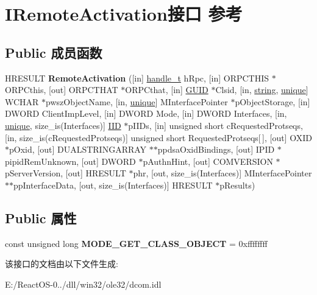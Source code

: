 \hypertarget{interface_i_remote_activation}{}\section{I\+Remote\+Activation接口 参考}
\label{interface_i_remote_activation}
\subsection*{Public 成员函数}
\begin{DoxyCompactItemize}
\item 
\mbox{\label{interface_i_remote_activation_afade8fcb021a199fd4f352177f6fe1b7}} 
H\+R\+E\+S\+U\+LT {\bfseries Remote\+Activation} (\mbox{[}in\mbox{]} \hyperlink{interfacevoid}{handle\+\_\+t} h\+Rpc, \mbox{[}in\mbox{]} O\+R\+P\+C\+T\+H\+IS $\ast$O\+R\+P\+Cthis, \mbox{[}out\mbox{]} O\+R\+P\+C\+T\+H\+AT $\ast$O\+R\+P\+Cthat, \mbox{[}in\mbox{]} \hyperlink{interface_g_u_i_d}{G\+U\+ID} $\ast$Clsid, \mbox{[}in, \hyperlink{structstring}{string}, \hyperlink{interfaceunique}{unique}\mbox{]} W\+C\+H\+AR $\ast$pwsz\+Object\+Name, \mbox{[}in, \hyperlink{interfaceunique}{unique}\mbox{]} M\+Interface\+Pointer $\ast$p\+Object\+Storage, \mbox{[}in\mbox{]} D\+W\+O\+RD Client\+Imp\+Level, \mbox{[}in\mbox{]} D\+W\+O\+RD Mode, \mbox{[}in\mbox{]} D\+W\+O\+RD Interfaces, \mbox{[}in, \hyperlink{interfaceunique}{unique}, size\+\_\+is(Interfaces)\mbox{]} \hyperlink{struct___i_i_d}{I\+ID} $\ast$p\+I\+I\+Ds, \mbox{[}in\mbox{]} unsigned short c\+Requested\+Protseqs, \mbox{[}in, size\+\_\+is(c\+Requested\+Protseqs)\mbox{]} unsigned short Requested\+Protseqs\mbox{[}$\,$\mbox{]}, \mbox{[}out\mbox{]} O\+X\+ID $\ast$p\+Oxid, \mbox{[}out\mbox{]} D\+U\+A\+L\+S\+T\+R\+I\+N\+G\+A\+R\+R\+AY $\ast$$\ast$ppdsa\+Oxid\+Bindings, \mbox{[}out\mbox{]} I\+P\+ID $\ast$pipid\+Rem\+Unknown, \mbox{[}out\mbox{]} D\+W\+O\+RD $\ast$p\+Authn\+Hint, \mbox{[}out\mbox{]} C\+O\+M\+V\+E\+R\+S\+I\+ON $\ast$p\+Server\+Version, \mbox{[}out\mbox{]} H\+R\+E\+S\+U\+LT $\ast$phr, \mbox{[}out, size\+\_\+is(Interfaces)\mbox{]} M\+Interface\+Pointer $\ast$$\ast$pp\+Interface\+Data, \mbox{[}out, size\+\_\+is(Interfaces)\mbox{]} H\+R\+E\+S\+U\+LT $\ast$p\+Results)
\end{DoxyCompactItemize}
\subsection*{Public 属性}
\begin{DoxyCompactItemize}
\item 
\mbox{\label{interface_i_remote_activation_ab48d355da6af9325468953d1df9bb10d}} 
const unsigned long {\bfseries M\+O\+D\+E\+\_\+\+G\+E\+T\+\_\+\+C\+L\+A\+S\+S\+\_\+\+O\+B\+J\+E\+CT} = 0xffffffff
\end{DoxyCompactItemize}


该接口的文档由以下文件生成\+:\begin{DoxyCompactItemize}
\item 
E\+:/\+React\+O\+S-\/0../dll/win32/ole32/dcom.\+idl\end{DoxyCompactItemize}
